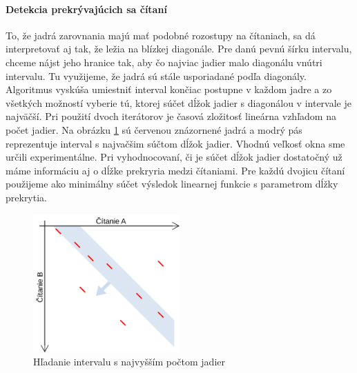 \paragraph{Detekcia prekrývajúcich sa čítaní}

To, že jadrá zarovnania majú mať podobné rozostupy na čítaniach, sa dá interpretovať aj tak, že ležia na blízkej diagonále. Pre danú pevnú šírku intervalu, chceme nájst jeho hranice tak, aby čo najviac jadier malo diagonálu vnútri intervalu. Tu využijeme, že jadrá sú stále usporiadané podľa diagonály. Algoritmus vyskúša umiestniť interval končiac postupne v každom jadre a zo všetkých možností vyberie tú, ktorej súčet dĺžok jadier s diagonálou v intervale je najväčší. Pri použití dvoch iterátorov je časová zložitosť lineárna vzhľadom na počet jadier. Na obrázku \ref{fig:diagonalovy_interval} sú červenou znázornené jadrá a modrý pás reprezentuje interval s najvačšim súčtom dĺžok jadier. Vhodnú veľkosť okna sme určili experimentálne. Pri vyhodnocovaní, či je súčet dĺžok jadier dostatočný už máme informáciu aj o dĺžke prekryria medzi čítaniami. Pre každú dvojicu čítaní použijeme ako minimálny súčet výsledok linearnej funkcie s parametrom dĺžky prekrytia.

\begin{figure}
    \centering
    \includegraphics[width=0.5\textwidth]{images/diagonalovy_interval.png}
    \caption{Hľadanie intervalu s najvyšším počtom jadier}
    \label{fig:diagonalovy_interval}
\end{figure} 